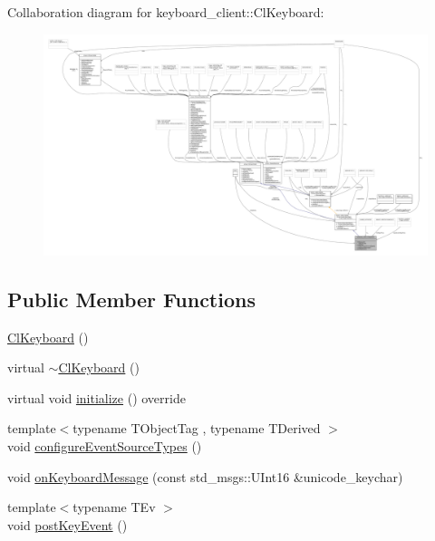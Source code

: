 Collaboration diagram for keyboard\+\_\+client\+:\+:Cl\+Keyboard\+:
\nopagebreak
\begin{figure}[H]
\begin{center}
\leavevmode
\includegraphics[width=350pt]{classkeyboard__client_1_1ClKeyboard__coll__graph}
\end{center}
\end{figure}
\subsection*{Public Member Functions}
\begin{DoxyCompactItemize}
\item 
\hyperlink{classkeyboard__client_1_1ClKeyboard_a4da263c77c076b959c4c21160af1bcb5}{Cl\+Keyboard} ()
\item 
virtual \hyperlink{classkeyboard__client_1_1ClKeyboard_a0e9bfb4a0e564e26f57248a78a78d087}{$\sim$\+Cl\+Keyboard} ()
\item 
virtual void \hyperlink{classkeyboard__client_1_1ClKeyboard_a7ac4502969c62b0c836b531cec05f8ed}{initialize} () override
\item 
{\footnotesize template$<$typename T\+Object\+Tag , typename T\+Derived $>$ }\\void \hyperlink{classkeyboard__client_1_1ClKeyboard_a9643ea9235ee12d054c87f79fbf31211}{configure\+Event\+Source\+Types} ()
\item 
void \hyperlink{classkeyboard__client_1_1ClKeyboard_adbfb9c2b98f784b12cf7740b4e861d8e}{on\+Keyboard\+Message} (const std\+\_\+msgs\+::\+U\+Int16 \&unicode\+\_\+keychar)
\item 
{\footnotesize template$<$typename T\+Ev $>$ }\\void \hyperlink{classkeyboard__client_1_1ClKeyboard_ad62d3548adfeca7f31469a283454dbeb}{post\+Key\+Event} ()
\end{DoxyCompactItemize}
